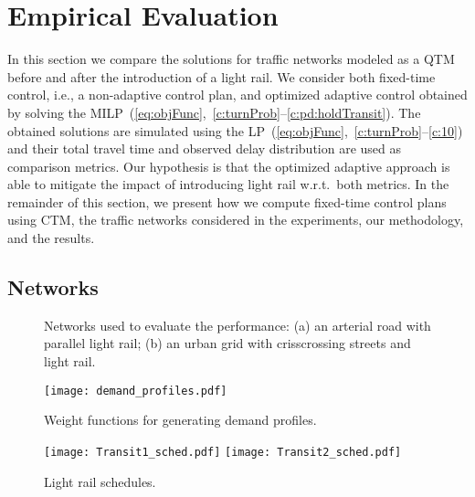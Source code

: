 \section{Empirical Evaluation}
  
In this section we compare the solutions for traffic networks modeled as a QTM
before and after the introduction of a light rail.
%
We consider both fixed-time control, i.e., a non-adaptive control plan, and optimized
adaptive control obtained by solving the
MILP~(\ref{eq:objFunc},~\ref{c:turnProb}--\ref{c:pd:holdTransit}).
%
The obtained solutions are simulated using the
LP~(\ref{eq:objFunc},~\ref{c:turnProb}--\ref{c:10}) and their total
travel time and observed delay distribution are used as comparison metrics.
%
Our hypothesis is that the optimized adaptive approach is able to mitigate the
impact of introducing light rail w.r.t.\ both metrics.
%
In the remainder of this section, we present how we compute fixed-time control plans
using CTM, the traffic networks considered in the experiments, our methodology,
and the results.






\subsection{Networks}

\begin{figure}[t!]
\centering
\caption{Networks used to evaluate the performance:
  (a) an arterial road with parallel light rail;
  (b) an urban grid with crisscrossing streets and light rail.
%
}
\label{fig:networks}
\end{figure}

\begin{figure}[t!]
\centering
\texttt{[image: demand\_profiles.pdf]}
\caption{Weight functions for generating demand profiles.}
\label{fig:demand_profiles}
\end{figure}

\begin{figure}[t!]
\centering
\texttt{[image: Transit1\_sched.pdf]}
\texttt{[image: Transit2\_sched.pdf]}
\caption{Light rail schedules.}
\label{fig:transits}
\end{figure}

